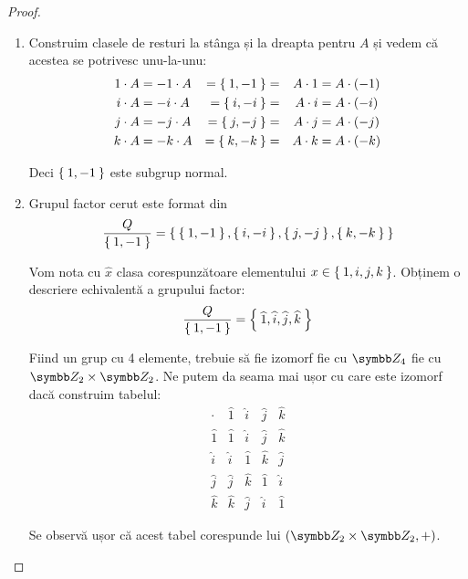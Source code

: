\begin{proof}
\begin{enumerate}
    \item Construim clasele de resturi la stânga și la dreapta pentru \(A\) și vedem că acestea se potrivesc unu-la-unu:
    \[
    \begin{aligned}[c]
        1 \cdot A &= -1 \cdot A \\
        i \cdot A &= -i \cdot A \\
        j \cdot A &= -j \cdot A \\
        k \cdot A &= -k \cdot A
    \end{aligned}
    \quad
    \begin{aligned}[c]
        = \Set{ 1, -1 } = \\
        = \Set{ i, -i } = \\
        = \Set{ j, -j } = \\
        = \Set{ k, -k } =
    \end{aligned}
    \quad
    \begin{aligned}[c]
        A \cdot 1 &= A \cdot (-1) \\
        A \cdot i &= A \cdot (-i) \\
        A \cdot j &= A \cdot (-j) \\
        A \cdot k &= A \cdot (-k)
    \end{aligned}
    \]
    
    Deci \(\Set{ 1, -1 }\) este subgrup normal.
    
    \item Grupul factor cerut este format din
    \[
        \frac{Q}{\Set{1, -1}} = \Set{ \Set{1, -1}, \Set{i, -i}, \Set{j, -j}, \Set{k, -k} }
    \]
    
    Vom nota cu \(\widehat{x}\) clasa corespunzătoare elementului \(x \in \Set{ 1, i, j, k }\).
    Obținem o descriere echivalentă a grupului factor:
    \[
        \frac{Q}{\Set{1, -1}} = \Set{ \widehat{1}, \widehat{i}, \widehat{j}, \widehat{k} }
    \]
    
    Fiind un grup cu 4 elemente, trebuie să fie izomorf fie cu \(\integersmod{4}\) fie cu \(\integersmod{2} \times \integersmod{2}\).
    Ne putem da seama mai ușor cu care este izomorf dacă construim tabelul:
    \[
    \begin{array}{c|c|c|c|c}
         \cdot & \widehat{1} & \widehat{i} & \widehat{j} & \widehat{k} \\
         \hline
         \widehat{1} & \widehat{1} & \widehat{i} & \widehat{j} & \widehat{k} \\
         \hline
         \widehat{i} & \widehat{i} & \widehat{1} & \widehat{k} & \widehat{j} \\
         \hline
         \widehat{j} & \widehat{j} & \widehat{k} & \widehat{1} & \widehat{i} \\
         \hline
         \widehat{k} & \widehat{k} & \widehat{j} & \widehat{i} & \widehat{1}
    \end{array}
    \]
    
    Se observă ușor că acest tabel corespunde lui \((\integersmod{2} \times \integersmod{2}, +)\).
\end{enumerate}
\end{proof}

